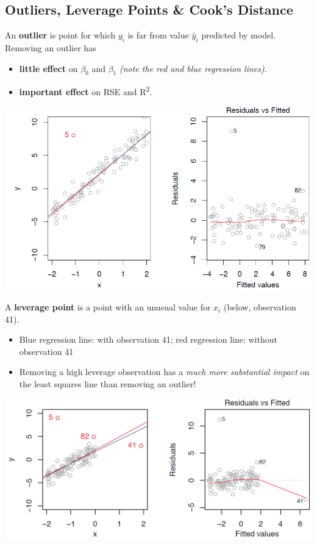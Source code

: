 \documentclass[11pt]{article}
\begin{document}
\subsection{Outliers, Leverage Points \& Cook's Distance}
An \textbf{outlier} is point for which $y_i$ is far from value $\hat{y}_i$ predicted by model. Removing an outlier has
\begin{itemize}[noitemsep]
	\item \textbf{little effect} on $\beta_0$ and $\beta_1$ \textit{(note the red and blue regression lines)}.
	\item \textbf{important effect} on RSE and R\textsuperscript{2}.
\end{itemize}
\begin{center}
	\includegraphics[width=0.6\linewidth]{img/outliers}
\end{center}

\noindent
A \textbf{leverage point} is a point with an unusual value for $x_i$ (below, observation 41). 

\begin{itemize}[noitemsep]
	\item Blue regression line: with observation 41; red regression line: without observation 41
	\item Removing a high leverage observation has a \textit{much more substantial impact} on the least squares line than removing an outlier!
\end{itemize}

\begin{center}
	\includegraphics[width=0.6\linewidth]{img/leverage-points}
\end{center}
\end{document}
